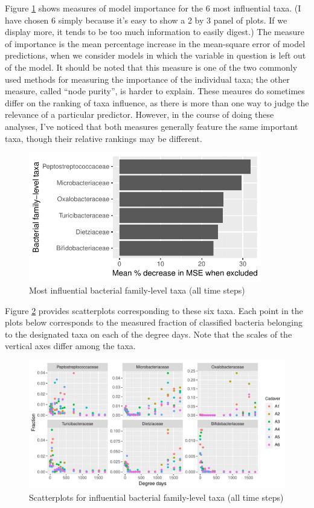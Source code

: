\documentclass{article}
\begin{document}
Figure \ref{fig:infl_bac_family_taxa} shows measures of model
importance for the 6 most influential taxa.  (I have chosen 6
simply because it's easy to show a 2 by 3 panel of plots.  If we
display more, it tends to be too much information to easily digest.)
The measure of importance is the mean percentage increase in the
mean-square error of model predictions, when we consider models in
which the variable in question is left out of the model.  It should be
noted that this measure is one of the two commonly used methods for
measuring the importance of the individual taxa; the other measure,
called ``node purity'', is harder to explain.  These meaures do
sometimes differ on the ranking of taxa influence, as there is more
than one way to judge the relevance of a particular predictor.
However, in the course of doing these analyses, I've noticed that both
measures generally feature the same important taxa, though their
relative rankings may be different.
\begin{figure}
  \centering
  \includegraphics[width=4in]{../revise_algorithm/only_families/all_time_steps/hit_1perc_twice/orig_units_all_data_families_PercIncMSE_barchart}
  \caption{Most influential bacterial family-level taxa (all time steps)}
  \label{fig:infl_bac_family_taxa}
\end{figure}

Figure \ref{fig:infl_bac_family_scatter} provides scatterplots
corresponding to these six taxa.  Each point in the plots below
corresponds to the measured fraction of classified bacteria belonging
to the designated taxa on each of the degree days.  Note that the
scales of the vertical axes differ among the taxa.
\begin{figure}
  \centering
  \includegraphics[width=7.5in]{../revise_algorithm/only_families/all_time_steps/hit_1perc_twice/infl_bac_family_all_data_scatter}
  \caption{Scatterplots for influential bacterial family-level taxa (all time steps)}
  \label{fig:infl_bac_family_scatter}
\end{figure}
\end{document}
